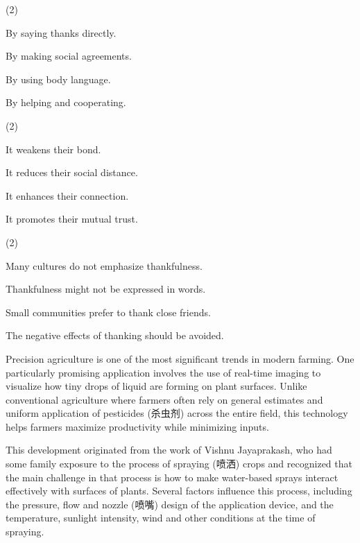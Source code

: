 \documentclass{英语试卷}
\begin{document}
\begin{choices}(2)
  \item By saying thanks directly.
  \item By making social agreements.
  \item By using body language.
  \item By helping and cooperating.
\end{choices}
\begin{choices}(2)
  \item It weakens their bond.
  \item It reduces their social distance.
  \item It enhances their connection.
  \item It promotes their mutual trust.
\end{choices}
\begin{choices}(2)
  \item Many cultures do not emphasize thankfulness.
  \item Thankfulness might not be expressed in words.
  \item Small communities prefer to thank close friends.
  \item The negative effects of thanking should be avoided.
\end{choices}
\par Precision agriculture is one of the most significant trends in modern farming. One particularly promising application involves the use of real-time imaging to visualize how tiny drops of liquid are forming on plant surfaces. Unlike conventional agriculture where farmers often rely on general estimates and uniform application of pesticides (杀虫剂) across the entire field, this technology helps farmers maximize productivity while minimizing inputs.\par
\par This development originated from the work of Vishnu Jayaprakash, who had some family exposure to the process of spraying (喷洒) crops and recognized that the main challenge in that process is how to make water-based sprays interact effectively with surfaces of plants. Several factors influence this process, including the pressure, flow and nozzle (喷嘴) design of the application device, and the temperature, sunlight intensity, wind and other conditions at the time of spraying.\par
\end{document}
